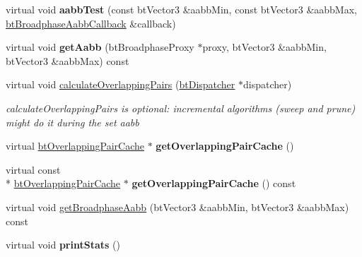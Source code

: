 \begin{DoxyCompactItemize}
\item 
\hypertarget{structbt_dbvt_broadphase_a910fd3065cf4d0ce828a84233fb5a18d}{virtual void {\bfseries aabb\+Test} (const bt\+Vector3 \&aabb\+Min, const bt\+Vector3 \&aabb\+Max, \hyperlink{structbt_broadphase_aabb_callback}{bt\+Broadphase\+Aabb\+Callback} \&callback)}\label{structbt_dbvt_broadphase_a910fd3065cf4d0ce828a84233fb5a18d}

\item 
\hypertarget{structbt_dbvt_broadphase_acebbcfd52c8d419a3074d2a63d49c3c9}{virtual void {\bfseries get\+Aabb} (bt\+Broadphase\+Proxy $\ast$proxy, bt\+Vector3 \&aabb\+Min, bt\+Vector3 \&aabb\+Max) const }\label{structbt_dbvt_broadphase_acebbcfd52c8d419a3074d2a63d49c3c9}

\item 
\hypertarget{structbt_dbvt_broadphase_a182741d147d9810758c886ce86fb03e6}{virtual void \hyperlink{structbt_dbvt_broadphase_a182741d147d9810758c886ce86fb03e6}{calculate\+Overlapping\+Pairs} (\hyperlink{classbt_dispatcher}{bt\+Dispatcher} $\ast$dispatcher)}\label{structbt_dbvt_broadphase_a182741d147d9810758c886ce86fb03e6}

\begin{DoxyCompactList}\small\item\em calculate\+Overlapping\+Pairs is optional\+: incremental algorithms (sweep and prune) might do it during the set aabb \end{DoxyCompactList}\item 
\hypertarget{structbt_dbvt_broadphase_af1c5727aa0b6bb3592e827429790c411}{virtual \hyperlink{classbt_overlapping_pair_cache}{bt\+Overlapping\+Pair\+Cache} $\ast$ {\bfseries get\+Overlapping\+Pair\+Cache} ()}\label{structbt_dbvt_broadphase_af1c5727aa0b6bb3592e827429790c411}

\item 
\hypertarget{structbt_dbvt_broadphase_a3bfd5d8fd93423fb5c38eb71bdff27de}{virtual const \\*
\hyperlink{classbt_overlapping_pair_cache}{bt\+Overlapping\+Pair\+Cache} $\ast$ {\bfseries get\+Overlapping\+Pair\+Cache} () const }\label{structbt_dbvt_broadphase_a3bfd5d8fd93423fb5c38eb71bdff27de}

\item 
virtual void \hyperlink{structbt_dbvt_broadphase_a32ab55b5ef2616d0cc039cd037c05d7f}{get\+Broadphase\+Aabb} (bt\+Vector3 \&aabb\+Min, bt\+Vector3 \&aabb\+Max) const 
\item 
\hypertarget{structbt_dbvt_broadphase_ab31c707eac04e1c34111497ffd98c82a}{virtual void {\bfseries print\+Stats} ()}\label{structbt_dbvt_broadphase_ab31c707eac04e1c34111497ffd98c82a}


\end{DoxyCompactItemize}
